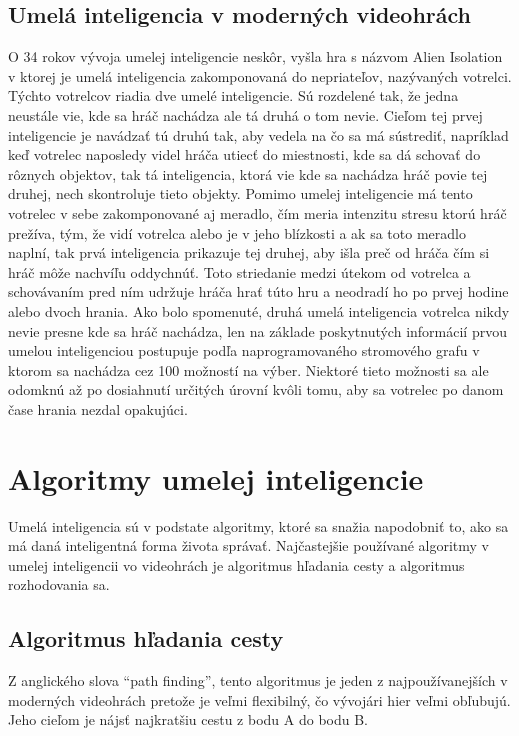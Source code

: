 \documentclass[10pt,oneside,slovak,a4paper]{article}
\begin{document}
\subsection{Umelá inteligencia v moderných videohrách} \label{kapitola2.3}
O 34 rokov vývoja umelej inteligencie neskôr, vyšla hra s názvom Alien Isolation v ktorej je umelá inteligencia zakomponovaná do nepriateľov, nazývaných votrelci. Týchto votrelcov riadia dve umelé inteligencie. \cite{AlienIsolationAI} Sú rozdelené tak, že jedna neustále vie, kde sa hráč nachádza ale tá druhá o tom nevie. Cieľom tej prvej inteligencie je navádzať tú druhú tak, aby vedela na čo sa má sústrediť, napríklad keď votrelec naposledy videl hráča utiecť do miestnosti, kde sa dá schovať do rôznych objektov, tak tá inteligencia, ktorá vie kde sa nachádza hráč povie tej druhej, nech skontroluje tieto objekty. Pomimo umelej inteligencie má tento votrelec v sebe zakomponované aj meradlo, čím meria intenzitu stresu ktorú hráč prežíva, tým, že vidí votrelca alebo je v jeho blízkosti a ak sa toto meradlo naplní, tak prvá inteligencia prikazuje tej druhej, aby išla preč od hráča čím si hráč môže nachvíľu oddychnúť. Toto striedanie medzi útekom od votrelca a schovávaním pred ním udržuje hráča hrať túto hru a neodradí ho po prvej hodine alebo dvoch hrania. Ako bolo spomenuté, druhá umelá inteligencia votrelca nikdy nevie presne kde sa hráč nachádza, len na základe poskytnutých informácií prvou umelou inteligenciou postupuje podľa naprogramovaného stromového grafu v ktorom sa nachádza cez 100 možností na výber. Niektoré tieto možnosti sa ale odomknú až po dosiahnutí určitých úrovní kvôli tomu, aby sa votrelec po danom čase hrania nezdal opakujúci.


\section{Algoritmy umelej inteligencie} \label{kapitola3}
Umelá inteligencia sú v podstate algoritmy, ktoré sa snažia napodobniť to, ako sa má daná inteligentná forma života správať. Najčastejšie používané algoritmy v umelej inteligencii vo videohrách je algoritmus hľadania cesty a algoritmus rozhodovania sa.

\subsection{Algoritmus hľadania cesty} \label{kapitola3.1}
Z anglického slova “path finding”, tento algoritmus je jeden z najpoužívanejších v moderných videohrách pretože je veľmi flexibilný, čo vývojári hier veľmi obľubujú. Jeho cieľom je nájsť najkratšiu cestu z bodu A do bodu B. 
\end{document}
